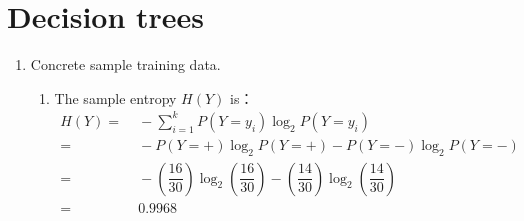 \documentclass[english]{article}
\begin{document}
\section{Decision trees}
\begin{enumerate}
\item Concrete sample training data.
  \begin{enumerate}
  \item The sample entropy $H(Y)$ is：
    \begin{align*}
      H(Y) =&\; - \sum_{i=1}^{k} P(Y = y_i) \log_2 P(Y = y_i) \\
      =&\; -P(Y = {+}) \log_2 P(Y = {+}) -  P(Y = {-}) \log_2 P(Y = {-})\\
      =&\; -(\dfrac{16}{30}) \log_2 (\dfrac{16}{30}) - (\dfrac{14}{30}) \log_2 (\dfrac{14}{30}) \\
      =&\; 0.9968
    \end{align*}


\end{enumerate}
\end{enumerate}
\end{document}
